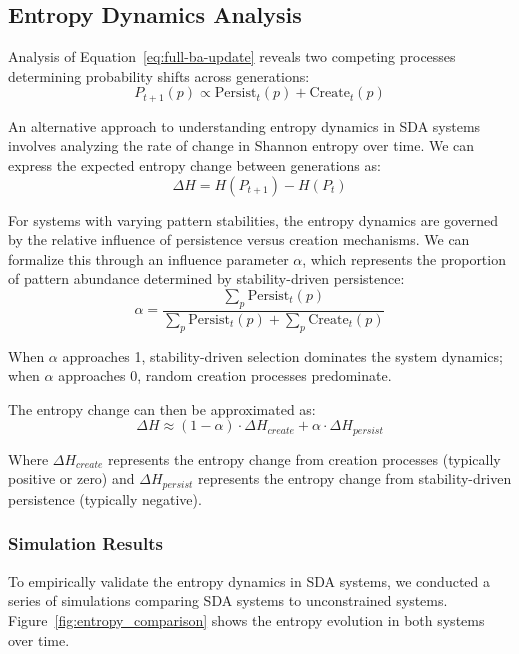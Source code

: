 \documentclass[preprint,12pt]{elsarticle}
\begin{document}
\subsection{Entropy Dynamics Analysis}
Analysis of Equation~\ref{eq:full-ba-update} reveals two competing processes determining probability shifts across generations:
\begin{equation}
P_{t+1}(p) \propto \mathrm{Persist}_t(p) + \mathrm{Create}_t(p)
\end{equation}

An alternative approach to understanding entropy dynamics in SDA systems involves analyzing the rate of change in Shannon entropy over time. We can express the expected entropy change between generations as:
\begin{equation}
\Delta H = H(P_{t+1}) - H(P_t)
\end{equation}

For systems with varying pattern stabilities, the entropy dynamics are governed by the relative influence of persistence versus creation mechanisms. We can formalize this through an influence parameter $\alpha$, which represents the proportion of pattern abundance determined by stability-driven persistence:
\begin{equation}
\alpha = \frac{\sum_p \mathrm{Persist}_t(p)}{\sum_p \mathrm{Persist}_t(p) + \sum_p \mathrm{Create}_t(p)}
\end{equation}

When $\alpha$ approaches 1, stability-driven selection dominates the system dynamics; when $\alpha$ approaches 0, random creation processes predominate.

The entropy change can then be approximated as:
\begin{equation}
\Delta H \approx (1 - \alpha) \cdot \Delta H_{create} + \alpha \cdot \Delta H_{persist}
\end{equation}

Where $\Delta H_{create}$ represents the entropy change from creation processes (typically positive or zero) and $\Delta H_{persist}$ represents the entropy change from stability-driven persistence (typically negative).

\subsubsection{Simulation Results}
To empirically validate the entropy dynamics in SDA systems, we conducted a series of simulations comparing SDA systems to unconstrained systems. Figure~\ref{fig:entropy_comparison} shows the entropy evolution in both systems over time.
\end{document}
